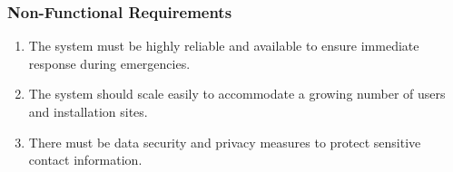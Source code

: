 \subsubsection{Non-Functional Requirements}

\begin{enumerate}
    \item The system must be highly reliable and available to ensure immediate response during emergencies.

    \item The system should scale easily to accommodate a growing number of users and installation sites.

    \item There must be data security and privacy measures to protect sensitive contact information.
\end{enumerate}
